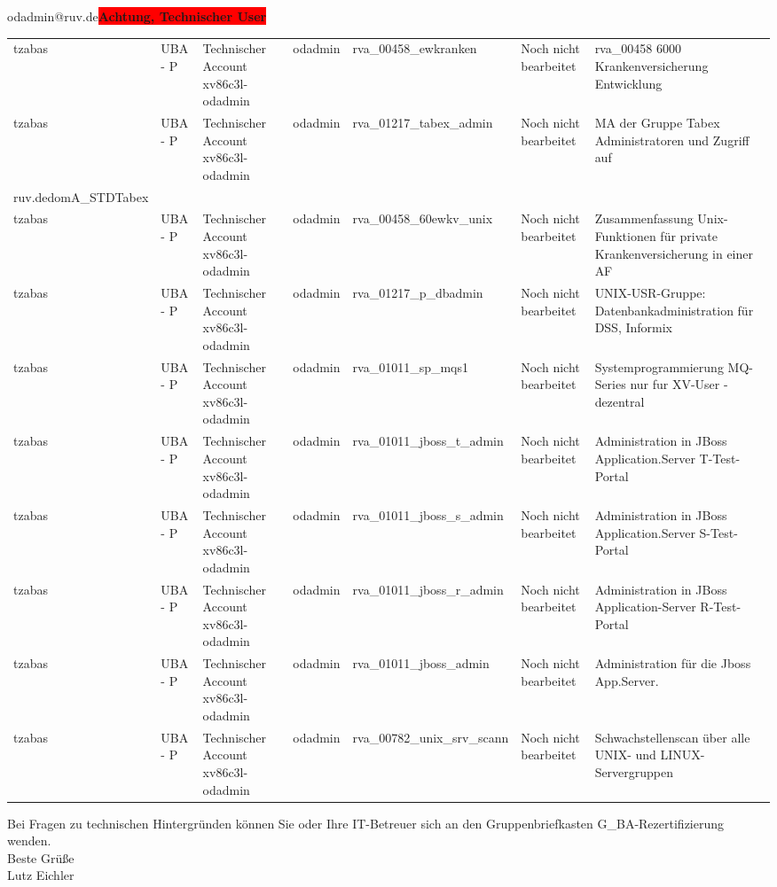 \documentclass[a4paper,landscape,12pt]{letter}
\begin{document}
\begin{letter}{odadmin@ruv.de\space\space\space\space\space\space\space\space\space\bfseries\colorbox{red}{Achtung, Technischer User}\hfill \break}
\begin{tiny}
\begin{longtable}{|p{35mm}|p{15mm}|p{25mm}|p{10mm}|p{40mm}|p{50mm}|p{50mm}|}
tzabas & UBA - P & Technischer Account xv86c3l-odadmin & odadmin & rva\_00458\_ewkranken & Noch nicht bearbeitet & rva\_00458 6000 Krankenversicherung Entwicklung \\
tzabas & UBA - P & Technischer Account xv86c3l-odadmin & odadmin & rva\_01217\_tabex\_admin & Noch nicht bearbeitet & MA der Gruppe Tabex Administratoren und Zugriff auf \\ruv.dedomA\_STDTabex \\
tzabas & UBA - P & Technischer Account xv86c3l-odadmin & odadmin & rva\_00458\_60ewkv\_unix & Noch nicht bearbeitet & Zusammenfassung Unix-Funktionen für private Krankenversicherung in einer AF \\
tzabas & UBA - P & Technischer Account xv86c3l-odadmin & odadmin & rva\_01217\_p\_dbadmin & Noch nicht bearbeitet & UNIX-USR-Gruppe: Datenbankadministration für  DSS, Informix \\
tzabas & UBA - P & Technischer Account xv86c3l-odadmin & odadmin & rva\_01011\_sp\_mqs1 & Noch nicht bearbeitet & Systemprogrammierung MQ-Series nur fur XV-User - dezentral \\
tzabas & UBA - P & Technischer Account xv86c3l-odadmin & odadmin & rva\_01011\_jboss\_t\_admin & Noch nicht bearbeitet & Administration in JBoss Application.Server T-Test-Portal \\
tzabas & UBA - P & Technischer Account xv86c3l-odadmin & odadmin & rva\_01011\_jboss\_s\_admin & Noch nicht bearbeitet & Administration in JBoss Application.Server S-Test-Portal \\
tzabas & UBA - P & Technischer Account xv86c3l-odadmin & odadmin & rva\_01011\_jboss\_r\_admin & Noch nicht bearbeitet & Administration in JBoss Application-Server R-Test-Portal \\
tzabas & UBA - P & Technischer Account xv86c3l-odadmin & odadmin & rva\_01011\_jboss\_admin & Noch nicht bearbeitet & Administration für die Jboss App.Server. \\
tzabas & UBA - P & Technischer Account xv86c3l-odadmin & odadmin & rva\_00782\_unix\_srv\_scann & Noch nicht bearbeitet & Schwachstellenscan über alle UNIX- und LINUX-Servergruppen \\

\hline
		\end{longtable}
		\end{tiny}
	
\begin{minipage}{\textwidth}
			Bei Fragen zu technischen Hintergründen können Sie 
			oder Ihre IT-Betreuer sich an den Gruppenbriefkasten 
			G\_BA-Rezertifizierung
			wenden.\\
			\linebreak
			Beste Grüße\\
			Lutz Eichler
	\end{minipage}
	\end{letter}
	
\end{document}
